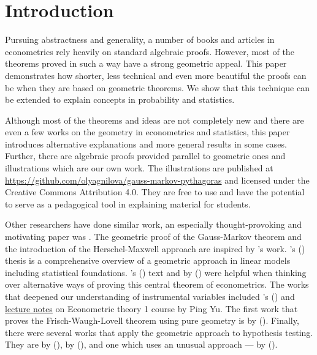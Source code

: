 \section{Introduction}

\begin{fullwidth}

Pursuing abstractness and generality, a number of books and articles in
econometrics rely heavily on standard algebraic proofs.
However, most of the theorems proved in such a way have a strong geometric appeal.
This paper demonstrates how shorter, less technical and even more beautiful the proofs
can be when they are based on geometric theorems.
We show that this technique can be extended to explain
concepts in probability and statistics.

Although most of the theorems and ideas are not completely new and
there are even a few works on the geometry in econometrics and statistics,
this paper introduces alternative explanations and more general results in some cases.
Further, there are algebraic proofs provided parallel to geometric ones
and illustrations which are our own work.
The illustrations are published at \url{https://github.com/olyagnilova/gauss-markov-pythagoras} and licensed under the
Creative Commons Attribution 4.0. %
They are free to use and have the potential to serve as a pedagogical tool
in explaining material for students.

Other researchers have done similar work, an especially
thought-provoking and motivating paper was
\citeauthor{cobb2011teaching}.
The geometric proof of the Gauss-Markov theorem and the introduction of the Herschel-Maxwell approach are inspired by
\citeauthor{cobb2011teaching}'s work.
\citeauthor{jacobson}'s (\citeyear{jacobson}) thesis 
is a comprehensive overview of a geometric approach in linear models including
statistical foundations.
\citeauthor{gmt_blue}’s (\citeyear{gmt_blue}) text  and
 by
\citeauthor{gmt_american_statistician} (\citeyear{gmt_american_statistician}) were helpful when thinking over
alternative ways of proving this central theorem of econometrics.
The works that deepened our understanding of instrumental variables included
\citeauthor{Butler2016}'s (\citeyear{Butler2016}) 
and \href{http://web.hku.hk/~pingyu/6005/6005.htm}{lecture notes} on Econometric theory 1 course by Ping Yu.
The first work that proves the Frisch-Waugh-Lovell theorem using pure geometry
is  by
\citeauthor{fwl} (\citeyear{fwl}).
Finally, there were several works that apply the geometric approach to
hypothesis testing. They are
by \citeauthor{Langsrud2004} (\citeyear{Langsrud2004}),
by \citeauthor{Siniksaran2005} (\citeyear{Siniksaran2005}),
and one which uses an unusual approach —
by \citeauthor{friendly2013} (\citeyear{friendly2013}).


\end{fullwidth}
